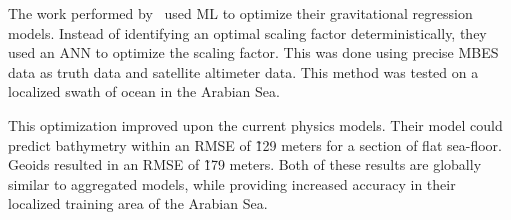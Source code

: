 \par
The work performed by~\cite{jena2012prediction} used \ac{ML} to optimize their gravitational regression models.
Instead of identifying an optimal scaling factor deterministically, they used an \ac{ANN} to optimize the scaling factor.
This was done using precise \ac{MBES} data as truth data and satellite altimeter data.
This method was tested on a localized swath of ocean in the Arabian Sea.

\par
This optimization improved upon the current physics models.
Their model could predict bathymetry within an \ac{RMSE} of \~129 meters for a section of flat sea-floor.
Geoids resulted in an \ac{RMSE} of \~179 meters.
Both of these results are globally similar to aggregated models, while providing increased accuracy in their localized training area of the Arabian Sea.

